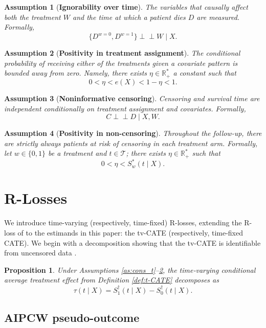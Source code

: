 \documentclass{article}
\newtheorem{proposition}[theorem]{Proposition}
\newtheorem{assumption}{Assumption}
\newcommand{\indep}{\perp \!\!\! \perp}%
\newcommand{\R}{\mathbb{R}}
\begin{document}
\begin{assumption}[{\bf Ignorability over time}]\label{as:ign_t} The variables that causally affect both the treatment $W$ and the time at which a patient dies  $D$ are measured. Formally, $$\{D^{w=0}, D^{w=1}\} \indep W \mid X.$$
\end{assumption}
\begin{assumption}[{\bf Positivity in treatment assignment}]\label{as:ovl} The conditional probability of receiving either of the treatments given a covariate pattern is bounded away from zero. Namely, there exists $\eta \in \R_+^*$ a constant such that $$0 < \eta <  e(X) < 1 - \eta < 1.$$
\end{assumption}
\begin{assumption}[{\bf Noninformative censoring}]\label{as:cens} Censoring and survival time are independent conditionally on treatment assignment and covariates. Formally, $$C \indep D \mid X, W.$$
\end{assumption}
\begin{assumption}[{\bf Positivity in non-censoring}]\label{as:ovl_cens}
Throughout the follow-up, there are strictly always patients at risk of censoring in each treatment arm.
Formally, let $w \in \{0,1\}$ be a treatment and $t \in \mathcal{T}$; there exists $\eta \in \R_+^*$ such that
\[
  0<\eta < S^*_w(t\mid X).
\]
\end{assumption}


\section{R-Losses}\label{sec:rlosses}
%
We introduce time-varying (respectively, time-fixed) R-losses, extending the R-loss of \citet{nie2021quasi} to the estimands in this paper: the tv-CATE (respectively, time-fixed CATE).
%
We begin with a decomposition showing that the tv-CATE is identifiable from uncensored data \citep{rosenbaum1983central}.
\begin{proposition}\label{prop:g}
Under Assumptions \ref{as:cons_t}–\ref{as:ovl}, the time‐varying conditional average treatment effect from Definition \ref{def:t-CATE} decomposes as $$\tau(t \mid X)=S^\dag_1(t \mid X)-S^\dag_0(t \mid X).$$
\end{proposition}

\subsection{AIPCW pseudo-outcome}
\end{document}
